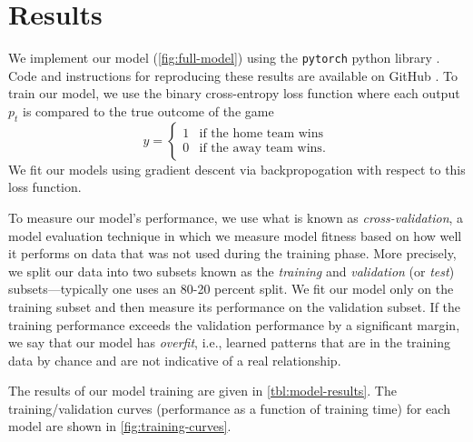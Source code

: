 \section{Results}

We implement our model (\autoref{fig:full-model}) using the \texttt{pytorch} python library \cite{pytorch}. Code and instructions for reproducing these results are available on GitHub \cite{stat-comps-github}. To train our model, we use the binary cross-entropy loss function where each output $p_t$ is compared to the true outcome of the game
\begin{equation}
	y = \begin{cases}
		1 & \text{if the home team wins}  \\
		0 & \text{if the away team wins}.
	\end{cases}
\end{equation}
We fit our models using gradient descent via backpropogation with respect to this loss function.

To measure our model's performance, we use what is known as \emph{cross-validation}, a model evaluation technique in which we measure model fitness based on how well it performs on data that was not used during the training phase.
More precisely, we split our data into two subsets known as the \emph{training} and \emph{validation} (or \emph{test}) subsets---typically one uses an 80-20 percent split. We fit our model only on the training subset and then measure its performance on the validation subset. If the training performance exceeds the validation performance by a significant margin, we say that our model has \emph{overfit}, i.e., learned patterns that are in the training data by chance and are not indicative of a real relationship.

The results of our model training are given in \autoref{tbl:model-results}. The training/validation curves (performance as a function of training time) for each model are shown in \autoref{fig:training-curves}.

